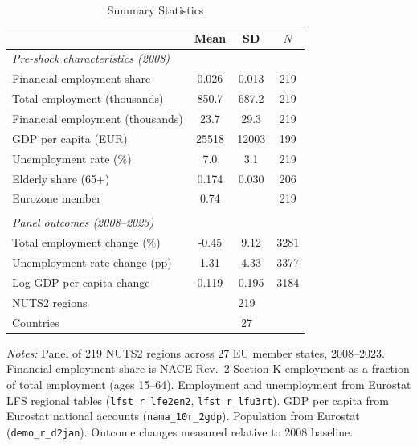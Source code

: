 \begin{table}[t]
\centering
\caption{Summary Statistics}
\label{tab:summary}
\begin{threeparttable}
\begin{tabular}{lccc}
\toprule
 & Mean & SD & $N$ \\
\midrule
\emph{Pre-shock characteristics (2008)} &  &  &  \\
\quad Financial employment share & 0.026 & 0.013 & 219 \\
\quad Total employment (thousands) & 850.7 & 687.2 & 219 \\
\quad Financial employment (thousands) & 23.7 & 29.3 & 219 \\
\quad GDP per capita (EUR) & 25518 & 12003 & 199 \\
\quad Unemployment rate (\%) & 7.0 & 3.1 & 219 \\
\quad Elderly share (65+) & 0.174 & 0.030 & 206 \\
\quad Eurozone member & 0.74 &  & 219 \\
\addlinespace \\
\emph{Panel outcomes (2008--2023)} &  &  &  \\
\quad Total employment change (\%) & -0.45 & 9.12 & 3281 \\
\quad Unemployment rate change (pp) & 1.31 & 4.33 & 3377 \\
\quad Log GDP per capita change & 0.119 & 0.195 & 3184 \\
\midrule
NUTS2 regions & \multicolumn{3}{c}{219} \\
Countries & \multicolumn{3}{c}{27} \\
\bottomrule
\end{tabular}
\begin{tablenotes}[flushleft]\footnotesize
\item \textit{Notes:} Panel of 219 NUTS2 regions across 27 EU member states, 2008--2023. Financial employment share is NACE Rev.~2 Section K employment as a fraction of total employment (ages 15--64). Employment and unemployment from Eurostat LFS regional tables (\texttt{lfst\_r\_lfe2en2}, \texttt{lfst\_r\_lfu3rt}). GDP per capita from Eurostat national accounts (\texttt{nama\_10r\_2gdp}). Population from Eurostat (\texttt{demo\_r\_d2jan}). Outcome changes measured relative to 2008 baseline.
\end{tablenotes}
\end{threeparttable}
\end{table}

